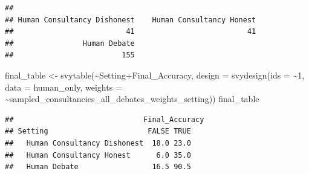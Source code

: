 \documentclass[
]{article}
\newenvironment{Shaded}{\begin{snugshade}}{\end{snugshade}}
\newcommand{\AttributeTok}[1]{\textcolor[rgb]{0.77,0.63,0.00}{#1}}
\newcommand{\ConstantTok}[1]{\textcolor[rgb]{0.00,0.00,0.00}{#1}}
\newcommand{\DecValTok}[1]{\textcolor[rgb]{0.00,0.00,0.81}{#1}}
\newcommand{\FunctionTok}[1]{\textcolor[rgb]{0.00,0.00,0.00}{#1}}
\newcommand{\NormalTok}[1]{#1}
\newcommand{\OtherTok}[1]{\textcolor[rgb]{0.56,0.35,0.01}{#1}}
\newcommand{\SpecialCharTok}[1]{\textcolor[rgb]{0.00,0.00,0.00}{#1}}
\newcommand{\StringTok}[1]{\textcolor[rgb]{0.31,0.60,0.02}{#1}}
\begin{document}
\begin{Shaded}
\end{Shaded}

\begin{verbatim}
## 
## Human Consultancy Dishonest    Human Consultancy Honest 
##                          41                          41 
##                Human Debate 
##                         155
\end{verbatim}

\begin{Shaded}
\begin{Highlighting}[]
\NormalTok{final\_table }\OtherTok{\textless{}{-}} \FunctionTok{svytable}\NormalTok{(}\SpecialCharTok{\textasciitilde{}}\NormalTok{Setting}\SpecialCharTok{+}\NormalTok{Final\_Accuracy, }
                        \AttributeTok{design =} \FunctionTok{svydesign}\NormalTok{(}\AttributeTok{ids =} \SpecialCharTok{\textasciitilde{}}\DecValTok{1}\NormalTok{, }
                                           \AttributeTok{data =}\NormalTok{ human\_only,}
                                           \AttributeTok{weights =} \SpecialCharTok{\textasciitilde{}}\NormalTok{sampled\_consultancies\_all\_debates\_weights\_setting))}
\NormalTok{final\_table}
\end{Highlighting}
\end{Shaded}

\begin{verbatim}
##                              Final_Accuracy
## Setting                       FALSE TRUE
##   Human Consultancy Dishonest  18.0 23.0
##   Human Consultancy Honest      6.0 35.0
##   Human Debate                 16.5 90.5
\end{verbatim}
\end{document}
